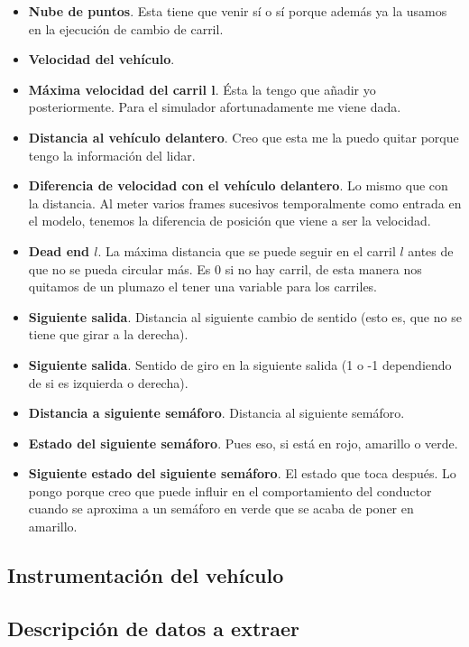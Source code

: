 \begin{itemize}
	\item \textbf{Nube de puntos}. Esta tiene que venir sí o sí porque además ya la usamos en la ejecución de cambio de carril.
	\item \textbf{Velocidad del vehículo}.
	\item \textbf{Máxima velocidad del carril l}. Ésta la tengo que añadir yo posteriormente. Para el simulador afortunadamente me viene dada.
	\item \textbf{Distancia al vehículo delantero}. Creo que esta me la puedo quitar porque tengo la información del lidar.
	\item \textbf{Diferencia de velocidad con el vehículo delantero}. Lo mismo que con la distancia. Al meter varios frames sucesivos temporalmente como entrada en el modelo, tenemos la diferencia de posición que viene a ser la velocidad.
	\item \textbf{Dead end $l$}. La máxima distancia que se puede seguir en el carril $l$ antes de que no se pueda circular más. Es 0 si no hay carril, de esta manera nos quitamos de un plumazo el tener una variable para los carriles.
	\item \textbf{Siguiente salida}. Distancia al siguiente cambio de sentido (esto es, que no se tiene que girar a la derecha).
	\item \textbf{Siguiente salida}. Sentido de giro en la siguiente salida (1 o -1 dependiendo de si es izquierda o derecha).
	\item \textbf{Distancia a siguiente semáforo}. Distancia al siguiente semáforo.
	\item \textbf{Estado del siguiente semáforo}. Pues eso, si está en rojo, amarillo o verde.
	\item \textbf{Siguiente estado del siguiente semáforo}. El estado que toca después. Lo pongo porque creo que puede influir en el comportamiento del conductor cuando se aproxima a un semáforo en verde que se acaba de poner en amarillo.
\end{itemize}

\subsection{Instrumentación del vehículo}

\subsection{Descripción de datos a extraer}

